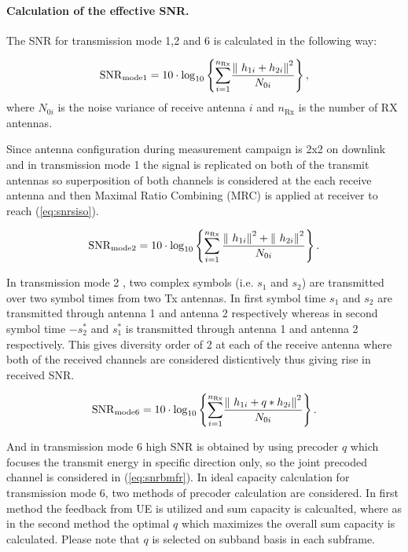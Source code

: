 \documentclass[a4paper,10pt]{article}
\begin{document}
\paragraph{Calculation of the effective SNR.}
The SNR for transmission mode 1,2 and 6 is calculated in the following way:

\begin{equation} \label{eq:snrsiso}
\mathrm{SNR}_{\mathrm{mode1}} = 10\cdot{\mathrm{log}}_{10} \left\lbrace {\sum_{i=1}^{n_{\mathrm{Rx}}}} {\frac{{\| \ {h_{1i}} + {h_{2i}} \| \\}^2}{N_{0i}}}\right\rbrace,
\end{equation}
where $N_{0i}$ is the noise variance of receive antenna $i$ and $n_{\mathrm{Rx}}$ is the number of RX antennas.

Since antenna configuration during measurement campaign is 2x2 on downlink and in transmission mode 1 the signal is replicated on both of the transmit antennas so superposition of both channels is considered at the each receive antenna and then Maximal Ratio Combining (MRC) is applied at receiver to reach (\ref{eq:snrsiso}). 
 
\begin{equation} \label{eq:snralam}
\mathrm{SNR}_{\mathrm{mode2}} = 10\cdot{\mathrm{log}}_{10} \left\lbrace {\sum_{i=1}^{n_{\mathrm{Rx}}}} \, {\frac{ {\| \ {h_{1i}} \| \\}^2 +  {\| \ {h_{2i}} \| \\}^2 }{N_{0i}}}\right\rbrace. 
\end{equation}

In transmission mode 2 , two complex symbols (i.e. $s_1$ and $s_2$) are transmitted over two symbol times from two Tx antennas. In first symbol time $s_1$ and $s_2$ are transmitted through antenna 1 and antenna 2 respectively whereas in second symbol time $-{s_{2}^{*}}$ and ${s_{1}^{*}}$ is transmitted through antenna 1 and antenna 2 respectively. This gives diversity order of 2 at each of the receive antenna where both of the received channels are considered disticntively thus giving rise in received SNR. 

\begin{equation} \label{eq:snrbmfr}
\mathrm{SNR}_{\mathrm{mode6}} = 10\cdot{\mathrm{log}}_{10} \left\lbrace {\sum_{i=1}^{n_{\mathrm{Rx}}}} {\frac{{\| \ {h_{1i}} + q*{h_{2i}} \| \\}^2}{N_{0i}}}\right\rbrace. 
\end{equation}

And in transmission mode 6 high SNR is obtained by using precoder $q$ which focuses the transmit energy in specific direction only, so the joint precoded channel is considered in (\ref{eq:snrbmfr}). In ideal capacity calculation for transmission mode 6, two methods of precoder calculation are considered. In first method the feedback from UE is utilized and sum capacity is calcualted, where as in the second method the optimal $q$ which maximizes the overall sum capacity is calculated. Please note that $q$ is selected on subband basis in each subframe.
\end{document}
